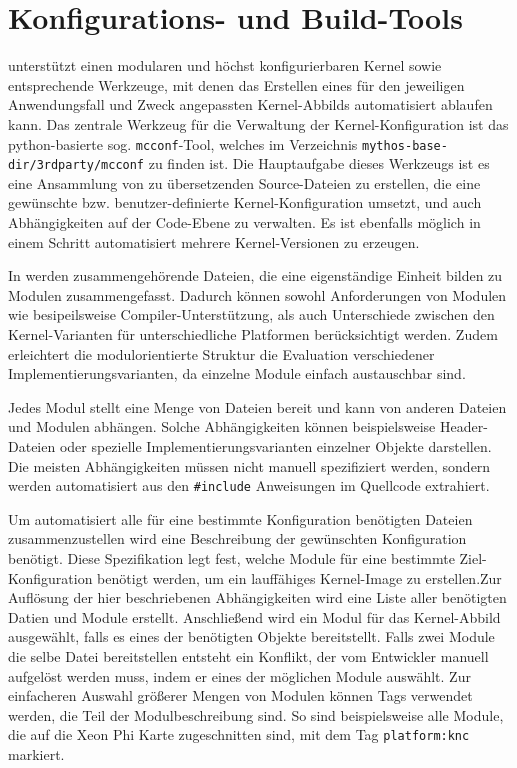 \section{Konfigurations- und Build-Tools}

\mythos unterstützt einen modularen und höchst konfigurierbaren Kernel sowie
entsprechende Werkzeuge, mit denen das Erstellen eines für den jeweiligen
Anwendungsfall und Zweck angepassten Kernel-Abbilds automatisiert ablaufen kann.
Das zentrale Werkzeug für die Verwaltung der Kernel-Konfiguration ist das
python-basierte sog. \texttt{mcconf}-Tool, welches im Verzeichnis
\texttt{{mythos-base-dir}/3rdparty/mcconf} zu finden ist. Die Hauptaufgabe
dieses Werkzeugs ist es eine Ansammlung von zu übersetzenden Source-Dateien zu
erstellen, die eine gewünschte bzw. benutzer-definierte Kernel-Konfiguration
umsetzt, und auch Abhängigkeiten auf der Code-Ebene zu verwalten. Es ist
ebenfalls möglich in einem Schritt automatisiert mehrere Kernel-Versionen zu
erzeugen. 

In \mythos werden zusammengehörende Dateien, die eine eigenständige Einheit
bilden zu Modulen zusammengefasst. Dadurch können sowohl Anforderungen von
Modulen wie besipeilsweise Compiler-Unterstützung, als auch Unterschiede
zwischen den Kernel-Varianten für unterschiedliche Platformen berücksichtigt
werden. Zudem erleichtert die modulorientierte Struktur die Evaluation
verschiedener Implementierungsvarianten, da einzelne Module einfach austauschbar
sind.

Jedes Modul stellt eine Menge von Dateien bereit und kann von anderen Dateien
und Modulen abhängen. Solche Abhängigkeiten können beispielsweise Header-Dateien
oder spezielle Implementierungsvarianten einzelner Objekte darstellen. Die
meisten Abhängigkeiten müssen nicht manuell spezifiziert werden, sondern werden
automatisiert aus den \texttt{\#include} Anweisungen im Quellcode extrahiert.

Um automatisiert alle für eine bestimmte Konfiguration benötigten Dateien
zusammenzustellen wird eine Beschreibung der gewünschten Konfiguration benötigt.
Diese Spezifikation legt fest, welche Module für eine bestimmte
Ziel-Konfiguration benötigt werden, um ein lauffähiges Kernel-Image zu
erstellen.\newline Zur Auflösung der hier beschriebenen Abhängigkeiten wird eine
Liste aller benötigten Datien und Module erstellt. Anschließend wird ein Modul
für das Kernel-Abbild ausgewählt, falls es eines der benötigten Objekte
bereitstellt.
Falls zwei Module die selbe Datei bereitstellen entsteht ein Konflikt, der vom
Entwickler manuell aufgelöst werden muss, indem er eines der möglichen Module
auswählt. Zur einfacheren Auswahl größerer Mengen von Modulen können Tags
verwendet werden, die Teil der Modulbeschreibung sind. So sind beispielsweise
alle Module, die auf die Xeon Phi Karte zugeschnitten sind, mit dem Tag
\texttt{platform:knc} markiert.

